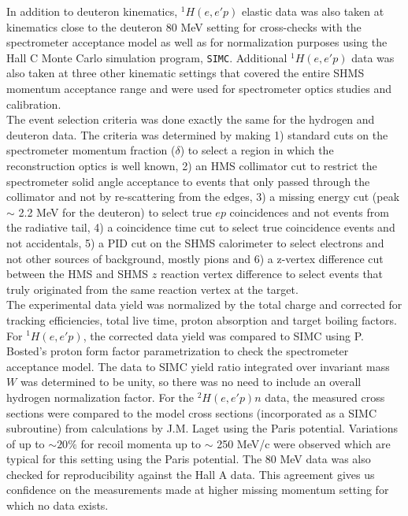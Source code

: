 \indent In addition to deuteron kinematics,  $^{1}H(e,e'p)$ elastic data was also taken at kinematics close to the deuteron 80 MeV setting for cross-checks with the spectrometer acceptance model as well as for normalization purposes using the  Hall C Monte Carlo
simulation program, \texttt{SIMC}. Additional $^{1}H(e,e'p)$ data was also taken at three other kinematic settings that covered the entire SHMS momentum acceptance range and were used for spectrometer optics studies and
calibration. \\
\indent The event selection criteria was done exactly the same for the hydrogen and deuteron data. The criteria was determined by making 1) standard cuts on the spectrometer momentum fraction ($\delta$) to select a region in which the reconstruction optics
is well known, 2) an HMS collimator cut to restrict the spectrometer solid angle acceptance to events that only passed through the collimator and not by re-scattering from the edges, 3) a missing
energy cut (peak $\sim$ 2.2 MeV for the deuteron) to select true $ep$ coincidences and not events from the radiative tail, 4) a coincidence time cut to select true coincidence events and not accidentals,  5) a PID cut on the
SHMS calorimeter to select electrons and not other sources of background, mostly pions and 6) a z-vertex difference cut between the HMS and SHMS $z$ reaction vertex difference to select events that truly
originated from the same reaction vertex at the target. \\
\indent The experimental data yield was normalized by the total charge and corrected for tracking efficiencies, total live time, proton absorption and target boiling factors.
For $^{1}H(e,e'p)$, the corrected data yield was compared to SIMC using P. Bosted's proton form factor parametrization\cite{PhysRevC.51.409} to check the spectrometer acceptance
model. The data to SIMC yield ratio integrated over invariant mass $W$ was determined to be unity, so there was no need to include an overall hydrogen normalization factor. For the $^{2}H(e,e'p)n$ data,
the measured cross sections were compared to the model cross sections (incorporated as a SIMC subroutine) from calculations by J.M. Laget using the Paris potential. Variations
of up to $\sim 20 \%$ for recoil momenta up to $\sim$ 250 MeV/c were observed which are typical for this setting using the Paris potential. The 80 MeV data was also checked for reproducibility against the Hall A data.
This agreement gives us confidence on the measurements made at higher missing momentum setting for which no data exists. \\
